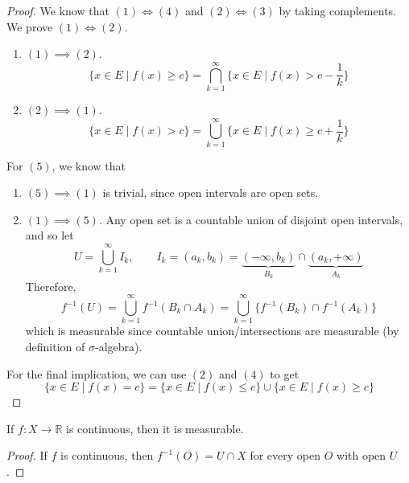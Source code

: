   \begin{proof}
    We know that $(1) \iff (4)$ and $(2) \iff (3)$ by taking complements. We prove $(1) \iff (2)$. 
    \begin{enumerate}
      \item $(1) \implies (2)$. 
      \begin{equation}
        \{x \in E \mid f(x) \geq c \} = \bigcap_{k=1}^\infty \{x \in E \mid f(x) > c - \frac{1}{k} \}
      \end{equation}

      \item $(2) \implies (1)$. 
      \begin{equation}
        \{ x \in E \mid f(x) > c\} = \bigcup_{k=1}^\infty \{x \in E \mid f(x) \geq c + \frac{1}{k} \}
      \end{equation}
    \end{enumerate}

    For $(5)$, we know that
    \begin{enumerate}
      \item $(5) \implies (1)$ is trivial, since open intervals are open sets. 
      \item $(1) \implies (5)$. Any open set is a countable union of disjoint open intervals, and so let 
      \begin{equation}
        U = \bigcup_{k=1}^\infty I_k, \qquad I_k = (a_k, b_k) = \underbrace{(-\infty, b_k)}_{B_k} \cap \underbrace{(a_k, +\infty)}_{A_k}
      \end{equation} 
      Therefore, 
      \begin{equation}
        f^{-1} (U) = \bigcup_{k=1}^\infty f^{-1} (B_k \cap A_k) = \bigcup_{k=1}^\infty \{f^{-1} (B_k) \cap f^{-1} (A_k) \}
      \end{equation}
      which is measurable since countable union/intersections are measurable (by definition of $\sigma$-algebra). 
    \end{enumerate}

    For the final implication, we can use $(2)$ and $(4)$ to get 
    \begin{equation}
      \{x \in E \mid f(x) = c\} = \{x \in E \mid f(x) \leq c \} \cup \{x \in E \mid f(x) \geq c \}
    \end{equation}
  \end{proof} 

  \begin{theorem}
    If $f: X \to \mathbb{R}$ is continuous, then it is measurable. 
  \end{theorem}
  \begin{proof}
    If $f$ is continuous, then $f^{-1} (O) = U \cap X$ for every open $O$ with open $U$. 
  \end{proof}

